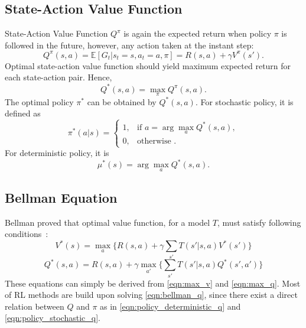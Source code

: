 \subsection{State-Action Value Function}

State-Action Value Function $Q^{\pi}$ is again the expected return when policy $\pi$ is followed in the future, 
however, any action taken at the instant step:
\begin{equation}
\label{eqn:q_def}
Q^{\pi}(s,a) = \mathbb{E}[G_t|s_t=s, a_t=a, \pi] = R(s,a) + \gamma V^{\pi}(s'). %
\end{equation}
Optimal state-action value function should yield maximum expected return for each state-action pair. Hence,
\begin{equation}
\label{eqn:max_q}
Q^{*}(s,a) = \max_{\pi} Q^{\pi}(s,a).
\end{equation}
The optimal policy $\pi^*$ can be obtained by $Q^{*}(s,a)$. For stochastic policy, it is defined as  
\begin{equation}
\label{eqn:policy_stochastic_q}
\pi^{*}(a|s) = 
\begin{cases}
1,   & \text{if  } a = \arg\max_{a} Q^{*}(s,a), \\
0,   & \text{otherwise  }.
\end{cases} 
\end{equation}
For deterministic policy, it is
\begin{equation}
\label{eqn:policy_deterministic_q}
\mu^{*}(s) = \arg\max_{a} Q^{*}(s,a).
\end{equation}

\subsection{Bellman Equation}

Bellman proved that optimal value function, for a model $T$, must satisfy following conditions~\cite{bellman_dynamic_2003}: 
\begin{equation}
\label{eqn:bellman_v}
V^{*}(s) = \max_{a} \Big\{ R(s,a) + \gamma \sum_{s'} T(s'|s,a) V^{*}(s') \Big\}
\end{equation}
\begin{equation}
\label{eqn:bellman_q}
Q^{*}(s,a) = R(s,a) + \gamma \max_{a'} \Big\{ \sum_{s'} T(s'|s,a) Q^{*}(s',a') \Big\}
\end{equation}
These equations can simply be derived from \eqref{eqn:max_v} and \eqref{eqn:max_q}. 
Most of RL methods are build upon solving \eqref{eqn:bellman_q}, since there exist a direct relation between $Q$ and $\pi$ as in \eqref{eqn:policy_deterministic_q} and \eqref{eqn:policy_stochastic_q}.
